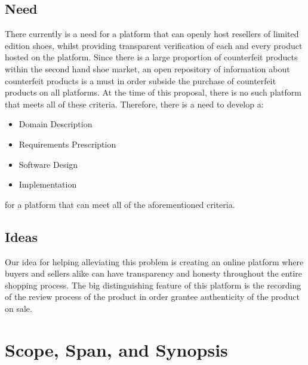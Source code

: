 \subsection{Need}
\hspace{1cm} There currently is a need for a platform that can openly host resellers of limited edition shoes, whilst providing transparent verification of each and every product hosted on the platform. Since there is a large proportion of counterfeit products within the second hand shoe market, an open repository of information about counterfeit products is a must in order subside the purchase of counterfeit products on all platforms. At the time of this proposal, there is no such platform that meets all of these criteria. Therefore, there is a need to develop a:
\begin{itemize}
  \item Domain Description
  \item Requirements Prescription
  \item Software Design
  \item Implementation
\end{itemize}
for a platform that can meet all of the aforementioned criteria.
\subsection{Ideas}
Our idea for helping alleviating this problem is creating an online platform where buyers and sellers alike can have transparency and honesty throughout the entire shopping process. The big distinguishing feature of this platform is the recording of the review process of the product in order grantee authenticity of the product on sale.
\section{Scope, Span, and Synopsis}
